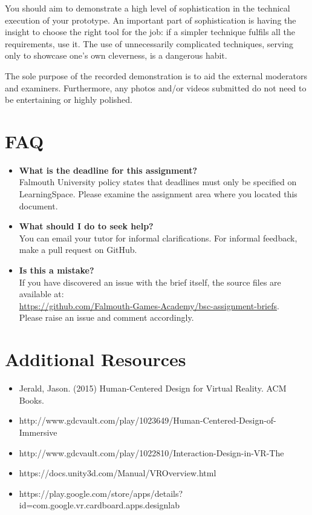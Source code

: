 \documentclass{../fal_assignment}
\begin{document}
You should aim to demonstrate a high level of sophistication in the technical execution of your prototype. An important part of sophistication is having the insight to choose the right tool for the job: if a simpler technique fulfils all the requirements, use it. The use of unnecessarily complicated techniques, serving only to showcase one's own cleverness, is a dangerous habit. 

The sole purpose of the recorded demonstration is to aid the external moderators and examiners. Furthermore, any photos and/or videos submitted do not need to be entertaining or highly polished.

\section*{FAQ}

\begin{itemize}
	\item 	\textbf{What is the deadline for this assignment?} \\ 
    		Falmouth University policy states that deadlines must only be specified on LearningSpace. Please examine the assignment area where you located this document.
    		
	\item 	\textbf{What should I do to seek help?} \\ 
    		You can email your tutor for informal clarifications. For informal feedback, make a pull request on GitHub. 
    		
    	\item 	\textbf{Is this a mistake?} \\ 	
    		If you have discovered an issue with the brief itself, the source files are available at: \\
    		\url{https://github.com/Falmouth-Games-Academy/bsc-assignment-briefs}.\\
    		 Please raise an issue and comment accordingly.
\end{itemize}

\section*{Additional Resources}

\begin{itemize}
    \item Jerald, Jason. (2015) Human-Centered Design for Virtual Reality. ACM Books.
    \item http://www.gdcvault.com/play/1023649/Human-Centered-Design-of-Immersive 
    \item http://www.gdcvault.com/play/1022810/Interaction-Design-in-VR-The
    \item https://docs.unity3d.com/Manual/VROverview.html
    \item https://play.google.com/store/apps/details?id=com.google.vr.cardboard.apps.designlab
    
\end{itemize}
\end{document}
